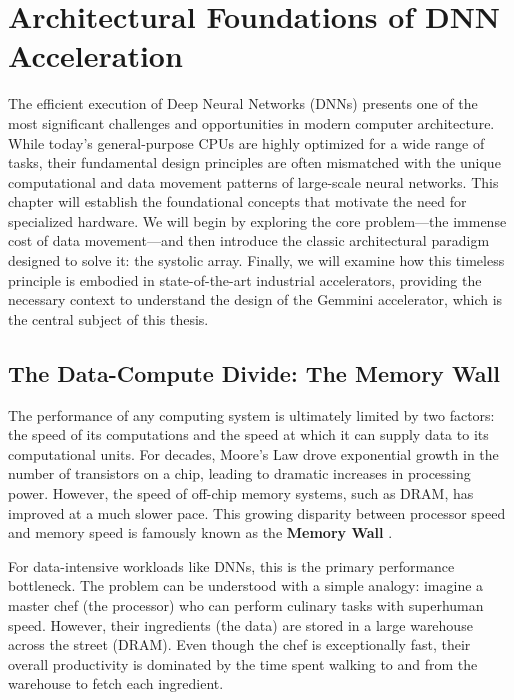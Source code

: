 \chapter{Architectural Foundations of DNN Acceleration}
\label{ch:foundations}

The efficient execution of Deep Neural Networks (DNNs) presents one of the most significant challenges and opportunities in modern computer architecture. While today's general-purpose CPUs are highly optimized for a wide range of tasks, their fundamental design principles are often mismatched with the unique computational and data movement patterns of large-scale neural networks. This chapter will establish the foundational concepts that motivate the need for specialized hardware. We will begin by exploring the core problem---the immense cost of data movement---and then introduce the classic architectural paradigm designed to solve it: the systolic array. Finally, we will examine how this timeless principle is embodied in state-of-the-art industrial accelerators, providing the necessary context to understand the design of the Gemmini accelerator, which is the central subject of this thesis.

\section{The Data-Compute Divide: The Memory Wall}
\label{sec:memory_wall}

The performance of any computing system is ultimately limited by two factors: the speed of its computations and the speed at which it can supply data to its computational units. For decades, Moore's Law drove exponential growth in the number of transistors on a chip, leading to dramatic increases in processing power. However, the speed of off-chip memory systems, such as DRAM, has improved at a much slower pace. This growing disparity between processor speed and memory speed is famously known as the \textbf{Memory Wall} \cite{wulf1995hitting}.

For data-intensive workloads like DNNs, this is the primary performance bottleneck. The problem can be understood with a simple analogy: imagine a master chef (the processor) who can perform culinary tasks with superhuman speed. However, their ingredients (the data) are stored in a large warehouse across the street (DRAM). Even though the chef is exceptionally fast, their overall productivity is dominated by the time spent walking to and from the warehouse to fetch each ingredient.

